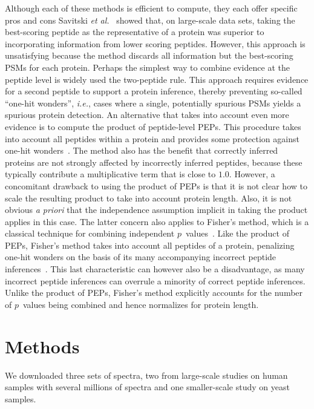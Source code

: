 \documentclass{article}
\begin{document}
Although each of these methods is efficient to compute, they each
offer specific pros and cons Savitski {\em et
  al.}~\cite{savitski2015scalable} showed that, on large-scale data
sets, taking the best-scoring peptide as the representative of a
protein was superior to incorporating information from lower scoring
peptides. However, this approach is unsatisfying because the method
discards all information but the best-scoring PSMs for each protein.
Perhaps the simplest way to combine evidence at the peptide level is
widely used the two-peptide rule.  This approach requires evidence for
a second peptide to support a protein inference, thereby preventing
so-called ``one-hit wonders'', {\em i.e.}, cases where a single,
potentially spurious PSMs yields a spurious protein detection. An
alternative that takes into account even more evidence is to compute
the product of peptide-level PEPs. This procedure takes into account
all peptides within a protein and provides some protection against
one-hit wonders~\cite{cox2008maxquant}. The method also has the
benefit that correctly inferred proteins are not strongly affected by
incorrectly inferred peptides, because these typically contribute a
multiplicative term that is close to $1.0$. However, a concomitant
drawback to using the product of PEPs is that it is not clear how to
scale the resulting product to take into account protein length.
Also, it is not obvious {\em a priori} that the independence
assumption implicit in taking the product applies in this case.  The
latter concern also applies to Fisher's method, which is a classical
technique for combining independent
$p$~values~\cite{fisher1925statistical}. Like the product of PEPs,
Fisher's method takes into account all peptides of a protein,
penalizing one-hit wonders on the basis of its many accompanying
incorrect peptide inferences~\cite{spirin2011assigning, alves2015mass,
  granholm2013determining}.  This last characteristic can however also
be a disadvantage, as many incorrect peptide inferences can overrule a
minority of correct peptide inferences.  Unlike the product of PEPs,
Fisher's method explicitly accounts for the number of $p$~values being
combined and hence normalizes for protein length.

\section*{Methods}

We downloaded three sets of spectra, two from large-scale studies on
human samples with several millions of spectra and one smaller-scale
study on yeast samples.
\end{document}
